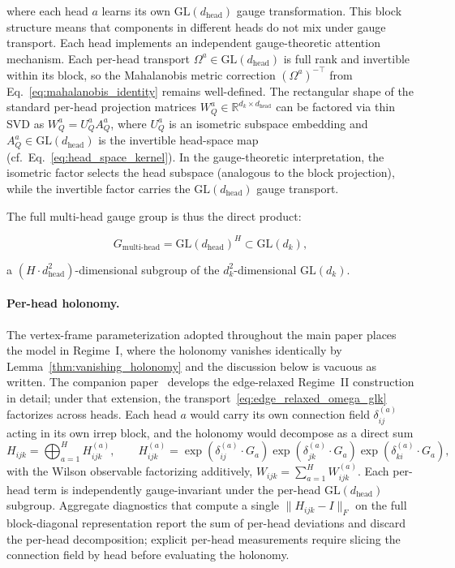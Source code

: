 \documentclass[twoside,11pt]{article}
\begin{document}
where each head $a$ learns its own $\mathrm{GL}(d_{\text{head}})$ gauge transformation. This block structure means that components in different heads do not mix under gauge transport. Each head implements an independent gauge-theoretic attention mechanism. Each per-head transport $\Omega^a \in \mathrm{GL}(d_{\text{head}})$ is full rank and invertible within its block, so the Mahalanobis metric correction $(\Omega^a)^{-\top}$ from Eq.~\eqref{eq:mahalanobis_identity} remains well-defined. The rectangular shape of the standard per-head projection matrices $W_Q^a \in \mathbb{R}^{d_k \times d_{\text{head}}}$ can be factored via thin SVD as $W_Q^a = U_Q^a A_Q^a$, where $U_Q^a$ is an isometric subspace embedding and $A_Q^a \in \mathrm{GL}(d_{\text{head}})$ is the invertible head-space map (cf.\ Eq.~\ref{eq:head_space_kernel}). In the gauge-theoretic interpretation, the isometric factor selects the head subspace (analogous to the block projection), while the invertible factor carries the $\mathrm{GL}(d_{\text{head}})$ gauge transport.

The full multi-head gauge group is thus the direct product:

\begin{equation}
G_{\text{multi-head}} = \mathrm{GL}(d_{\text{head}})^H \subset \mathrm{GL}(d_k),
\end{equation}

a $(H \cdot d_{\text{head}}^2)$-dimensional subgroup of the $d_k^2$-dimensional $\mathrm{GL}(d_k)$.

\paragraph{Per-head holonomy.} The vertex-frame parameterization adopted throughout the main paper places the model in Regime~I, where the holonomy vanishes identically by Lemma~\ref{thm:vanishing_holonomy} and the discussion below is vacuous as written. The companion paper~\citep{Dennis2025it} develops the edge-relaxed Regime~II construction in detail; under that extension, the transport~\eqref{eq:edge_relaxed_omega_glk} factorizes across heads. Each head $a$ would carry its own connection field $\delta_{ij}^{(a)}$ acting in its own irrep block, and the holonomy would decompose as a direct sum
\begin{equation}
H_{ijk} = \bigoplus_{a=1}^{H} H_{ijk}^{(a)},
\qquad
H_{ijk}^{(a)} = \exp(\delta_{ij}^{(a)}\cdot G_a) \exp(\delta_{jk}^{(a)}\cdot G_a) \exp(\delta_{ki}^{(a)}\cdot G_a),
\end{equation}
with the Wilson observable factorizing additively, $W_{ijk} = \sum_{a=1}^H W_{ijk}^{(a)}$. Each per-head term is independently gauge-invariant under the per-head $\mathrm{GL}(d_{\text{head}})$ subgroup. Aggregate diagnostics that compute a single $\|H_{ijk} - I\|_F$ on the full block-diagonal representation report the sum of per-head deviations and discard the per-head decomposition; explicit per-head measurements require slicing the connection field by head before evaluating the holonomy.
\end{document}
